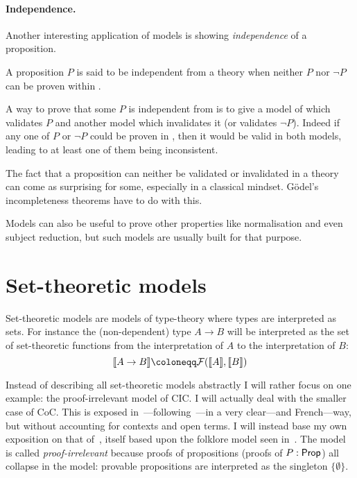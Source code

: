 \paragraph{Independence.}

Another interesting application of models is showing \emph{independence} of a
proposition.

\begin{definition}
  A proposition \(P\) is said to be independent from a theory \cT when neither
  \(P\) nor \(\neg P\) can be proven within \cT.
\end{definition}

A way to prove that some \(P\) is independent from \cT is to give a model of \cT
which validates \(P\) and another model which invalidates it (or validates
\(\neg P\)). Indeed if any one of \(P\) or \(\neg P\) %
could be proven in \cT, then it would be valid in both models, leading to
at least one of them being inconsistent.

The fact that a proposition can neither be validated or invalidated in a theory
can come as surprising for some, especially in a classical mindset.
Gödel's incompleteness theorems have to do with this.

Models can also be useful to prove other properties like normalisation and even
subject reduction, but such models are usually built for that purpose.

\section{Set-theoretic models}

Set-theoretic models are models of type-theory where types are interpreted as
sets. For instance the (non-dependent) type \(A \to B\) will be interpreted as
the set of set-theoretic functions from the interpretation of \(A\) to the
interpretation of \(B\):
\[
  \transl{A \to B} \coloneqq \setfun{\transl{A}}{\transl{B}}
\]

Instead of describing all set-theoretic models abstractly I will rather focus on
one example: the proof-irrelevant model of \acrshort{CIC}. I will actually deal
with the smaller case of \acrshort{CoC}.
This is exposed
in~---following~---in
a very clear---and French---way,
but without accounting for contexts and open terms.
I will instead base my own exposition on that of~,
itself based upon the folklore model seen
in~.
The model is called \emph{proof-irrelevant} because proofs of propositions
(proofs of \(P : \mathsf{Prop}\)) all collapse in the model: provable propositions
are interpreted as the singleton \(\{ \emptyset \}\).


